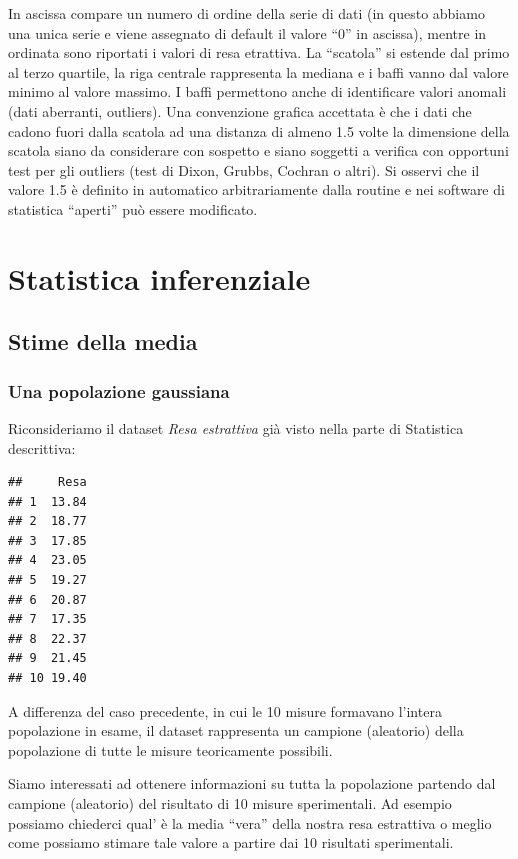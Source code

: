 \documentclass[
  11pt,
]{book}
\begin{document}
In ascissa compare un numero di ordine della serie di dati (in questo abbiamo una unica serie e viene assegnato di default il valore ``0'' in ascissa), mentre in ordinata sono riportati i valori di resa etrattiva. La ``scatola'' si estende dal primo al terzo quartile, la riga centrale rappresenta la mediana e i baffi vanno dal valore minimo al valore massimo. I baffi permettono anche di identificare valori anomali (dati aberranti, outliers). Una convenzione grafica accettata è che i dati che cadono fuori dalla scatola ad una distanza di almeno 1.5 volte la dimensione della scatola siano da considerare con sospetto e siano soggetti a verifica con opportuni test per gli outliers (test di Dixon, Grubbs, Cochran o altri).
Si osservi che il valore 1.5 è definito in automatico arbitrariamente dalla routine e nei software di statistica ``aperti'' può essere modificato.

\hypertarget{statistica-inferenziale}{%
\chapter{Statistica inferenziale}\label{statistica-inferenziale}}

\hypertarget{stime-della-media}{%
\section{Stime della media}\label{stime-della-media}}

\hypertarget{una-popolazione-gaussiana}{%
\subsection{Una popolazione gaussiana}\label{una-popolazione-gaussiana}}

Riconsideriamo il dataset \emph{Resa estrattiva} già visto nella parte di Statistica descrittiva:

\begin{verbatim}
##     Resa
## 1  13.84
## 2  18.77
## 3  17.85
## 4  23.05
## 5  19.27
## 6  20.87
## 7  17.35
## 8  22.37
## 9  21.45
## 10 19.40
\end{verbatim}

A differenza del caso precedente, in cui le 10 misure formavano l'intera popolazione in esame, il dataset rappresenta un campione (aleatorio) della popolazione di tutte le misure teoricamente possibili.

Siamo interessati ad ottenere informazioni su tutta la popolazione partendo dal campione (aleatorio) del risultato di
10 misure sperimentali. Ad esempio possiamo chiederci qual' è la media ``vera'' della nostra resa estrattiva o meglio come possiamo stimare tale valore a partire dai 10 risultati sperimentali.
\end{document}
